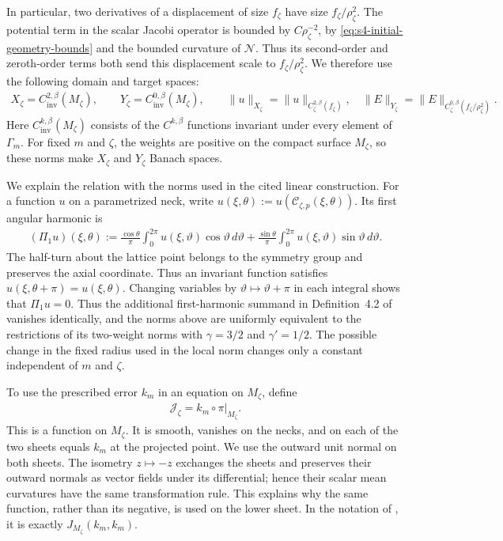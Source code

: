 \documentclass[a4paper,11pt,oneside,reqno]{amsart}
\numberwithin{equation}{section}
\theoremstyle{definition}
\begin{document}
In particular, two derivatives of a displacement of size
$f_\zeta$ have size $f_\zeta/\rho_\zeta^2$.
The potential term in the scalar Jacobi operator is bounded
by $C\rho_\zeta^{-2}$, by
\eqref{eq:s4-initial-geometry-bounds} and the bounded curvature
of $\mathcal N$. Thus its second-order and zeroth-order terms
both send this displacement scale to $f_\zeta/\rho_\zeta^2$.
We therefore use the following domain and target spaces:
%
\begin{align}
    \label{eq:s4-XY}
    X_\zeta=C^{2,\beta}_{\mathrm{inv}}(M_\zeta),\qquad
    Y_\zeta=C^{0,\beta}_{\mathrm{inv}}(M_\zeta),\qquad
    \|u\|_{X_\zeta}=\|u\|_{C^{2,\beta}_\zeta(f_\zeta)},\quad
    \|E\|_{Y_\zeta}=\|E\|_{C^{0,\beta}_\zeta(f_\zeta/\rho_\zeta^2)}.
\end{align}
%
Here $C^{k,\beta}_{\mathrm{inv}}(M_\zeta)$ consists of the
$C^{k,\beta}$ functions invariant under every element of
$\Gamma_m$. For fixed $m$ and $\zeta$, the weights are
positive on the compact surface $M_\zeta$, so these norms
make $X_\zeta$ and $Y_\zeta$ Banach spaces.

We explain the relation with the norms used in the cited
linear construction. For a function $u$ on a parametrized neck,
write $u(\xi,\theta):=u(\mathcal C_{\zeta,p}(\xi,\theta))$.
Its first angular harmonic is
%
\begin{align*}
    (\Pi_1u)(\xi,\theta)
    :=\frac{\cos\theta}{\pi}
       \int_0^{2\pi}u(\xi,\vartheta)\cos\vartheta\,d\vartheta
      +\frac{\sin\theta}{\pi}
       \int_0^{2\pi}u(\xi,\vartheta)\sin\vartheta\,d\vartheta.
\end{align*}
%
The half-turn about the lattice point belongs to the symmetry
group and preserves the axial coordinate. Thus an invariant
function satisfies $u(\xi,\theta+\pi)=u(\xi,\theta)$.
Changing variables by $\vartheta\mapsto\vartheta+\pi$ in
each integral shows that $\Pi_1u=0$.
Thus the additional first-harmonic summand in Definition~4.2
of \cite{KapouleasMcGrathLD} vanishes identically, and the
norms above are uniformly equivalent to the restrictions of its
two-weight norms with $\gamma=3/2$ and $\gamma'=1/2$.
The possible change in the fixed radius used in the local norm
changes only a constant independent of $m$ and $\zeta$.

To use the prescribed error $k_m$ in an equation on $M_\zeta$,
define
%
\begin{align}
    \label{eq:s4-J-lift}
    \mathcal{J}_\zeta=k_m\circ\pi\big|_{M_\zeta}.
\end{align}
%
This is a function on $M_\zeta$. It is smooth, vanishes on
the necks, and on each of the two sheets equals $k_m$ at
the projected point. We use the outward unit normal on both
sheets. The isometry $z\mapsto-z$ exchanges the sheets and
preserves their outward normals as vector fields under its
differential; hence their scalar mean curvatures have the same
transformation rule. This explains why the same function,
rather than its negative, is used on the lower sheet.
In the notation of \cite[Notation~3.25]{KapouleasMcGrathLD},
it is exactly $J_{M_\zeta}(k_m,k_m)$.
\end{document}
